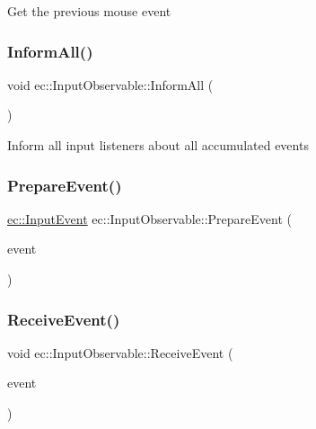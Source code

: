 Get the previous mouse event \mbox{\label{classec_1_1_input_observable_a2c3af1f58103d41e21bd95fed9131c5b}} 
\subsubsection{\texorpdfstring{Inform\+All()}{InformAll()}}
{\footnotesize\ttfamily void ec\+::\+Input\+Observable\+::\+Inform\+All (\begin{DoxyParamCaption}{ }\end{DoxyParamCaption})\hspace{0.3cm}{\ttfamily [virtual]}}

Inform all input listeners about all accumulated events \mbox{\label{classec_1_1_input_observable_a99d0fa147a66bf09c7bedaa3d556cee2}} 
\subsubsection{\texorpdfstring{Prepare\+Event()}{PrepareEvent()}}
{\footnotesize\ttfamily \mbox{\hyperlink{structec_1_1_input_event}{ec\+::\+Input\+Event}} ec\+::\+Input\+Observable\+::\+Prepare\+Event (\begin{DoxyParamCaption}\item[{const \mbox{\hyperlink{structec_1_1_input_event}{Input\+Event}} \&}]{event }\end{DoxyParamCaption})\hspace{0.3cm}{\ttfamily [protected]}}

\mbox{\label{classec_1_1_input_observable_aa043e1a78987c55e03acca7caf13820f}} 
\subsubsection{\texorpdfstring{Receive\+Event()}{ReceiveEvent()}}
{\footnotesize\ttfamily void ec\+::\+Input\+Observable\+::\+Receive\+Event (\begin{DoxyParamCaption}\item[{const \mbox{\hyperlink{structec_1_1_input_event}{Input\+Event}} \&}]{event }\end{DoxyParamCaption})\hspace{0.3cm}{\ttfamily [virtual]}}

